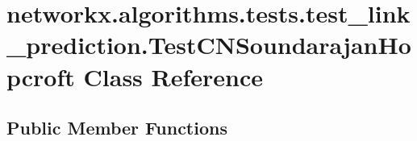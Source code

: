 \hypertarget{classnetworkx_1_1algorithms_1_1tests_1_1test__link__prediction_1_1TestCNSoundarajanHopcroft}{}\section{networkx.\+algorithms.\+tests.\+test\+\_\+link\+\_\+prediction.\+Test\+C\+N\+Soundarajan\+Hopcroft Class Reference}
\label{classnetworkx_1_1algorithms_1_1tests_1_1test__link__prediction_1_1TestCNSoundarajanHopcroft}
\subsection*{Public Member Functions}
